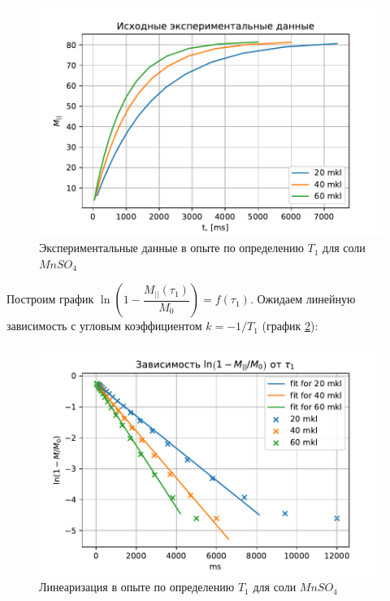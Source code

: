 \begin{figure}[!h]
	\hspace{-5em}
	\includegraphics[width=1.2\linewidth]{data/Mn_T_1_exp}
	\caption{Экспериментальные данные в опыте по определению $ T_1 $ для соли $ Mn SO_4 $}
	\label{fig:mnt1exp}
\end{figure}

Построим график $ \ln \left( 1 - \dfrac{M_{||} (\tau_1)}{M_0} \right) = f(\tau_1)$. Ожидаем линейную зависимость с угловым коэффициентом $ k = -1/T_1 $ (график \ref{fig:mnt1reg}):

\begin{figure}[h]
	\hspace{-5em}
	\includegraphics[width=1.2\linewidth]{data/Mn_T_1_reg}
	\caption{Линеаризация в опыте по определению $ T_1 $ для соли $ Mn SO_4 $}
	\label{fig:mnt1reg}
\end{figure}

